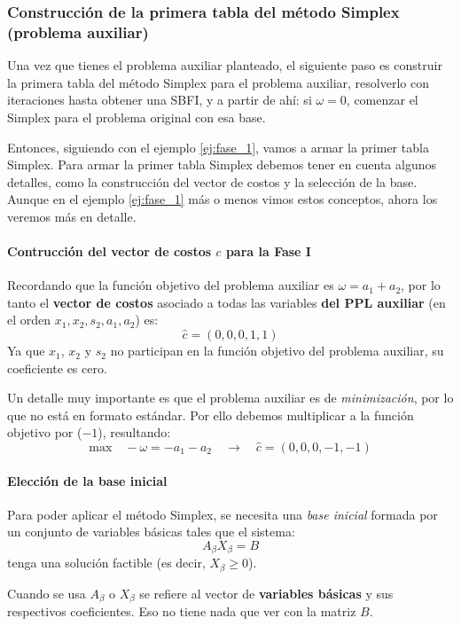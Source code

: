 \subsubsection{Construcción de la primera tabla del método Simplex (problema auxiliar)}

Una vez que tienes el problema auxiliar planteado, el siguiente paso es construir la primera tabla del método Simplex para el problema auxiliar, resolverlo con iteraciones hasta obtener una SBFI, y a partir de ahí: si \(\omega = 0\), comenzar el Simplex para el problema original con esa base.

Entonces, siguiendo con el ejemplo \ref{ej:fase_1}, vamos a armar la primer tabla Simplex. Para armar la primer tabla Simplex debemos tener en cuenta algunos detalles, como la construcción del vector de costos y la selección de la base. Aunque en el ejemplo \ref{ej:fase_1} más o menos vimos estos conceptos, ahora los veremos más en detalle.

\paragraph{Contrucción del vector de costos \(c\) para la Fase I}

Recordando que la función objetivo del problema auxiliar es \(\omega = a_1 + a_2\), por lo tanto el \textbf{vector de costos} asociado a todas las variables \textbf{del PPL auxiliar} (en el orden \(x_1, x_2, s_2, a_1, a_2\)) es: 
\[
  \hat{c} = (0, 0, 0, 1, 1)
\]
Ya que \(x_1\), \(x_2\) y \(s_2\) no participan en la función objetivo del problema auxiliar, su coeficiente es cero.

Un detalle muy importante es que el problema auxiliar es de \textit{minimización}, por lo que no está en formato estándar. Por ello debemos multiplicar a la función objetivo por (\(-1\)), resultando:
\[
  \text{max} \quad -\omega = - a_1 - a_2 \quad \rightarrow \quad \hat{c}=(0,0,0,-1,-1)
\]



\paragraph{Elección de la base inicial}

Para poder aplicar el método Simplex, se necesita una \textit{base inicial} formada por un conjunto de variables básicas tales que el sistema:
\[
A_{\beta}X_{\beta} = B
\]
tenga una solución factible (es decir, \(X_\beta \geq 0\)).
\begin{tcolorbox}[remember, title=Aclaración]
  Cuando se usa \(A_\beta\) o \(X_\beta\) se refiere al vector de \textbf{variables básicas} y sus respectivos coeficientes. Eso no tiene nada que ver con la matriz \(B\).
\end{tcolorbox}

